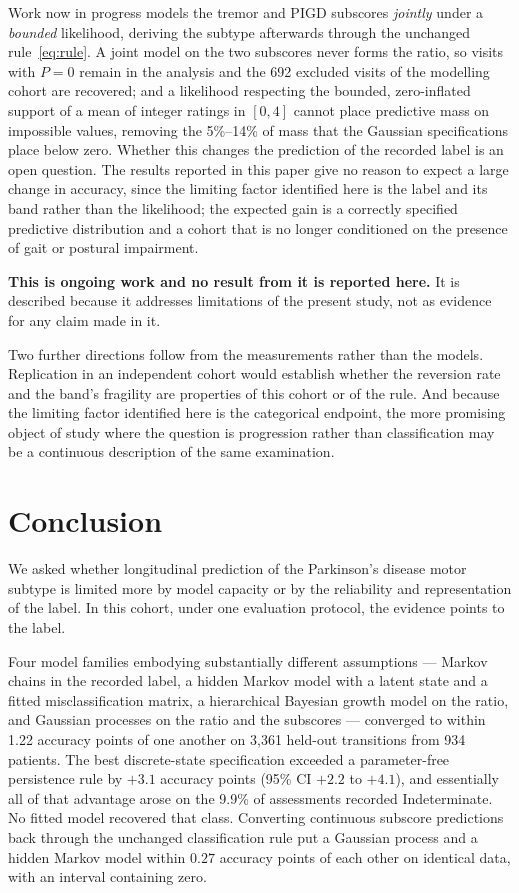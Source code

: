 \documentclass[11pt]{article}
\begin{document}
Work now in progress models the tremor and PIGD subscores \emph{jointly} under a
\emph{bounded} likelihood, deriving the subtype afterwards through the unchanged
rule~\eqref{eq:rule}. A joint model on the two subscores never forms the ratio,
so visits with $P = 0$ remain in the analysis and the 692 excluded visits of the
modelling cohort are recovered; and a likelihood respecting the bounded,
zero-inflated support of a mean of integer ratings in $[0,4]$ cannot place
predictive mass on impossible values, removing the 5\%--14\% of mass that the
Gaussian specifications place below zero. Whether this changes the prediction of
the recorded label is an open question. The results reported in this paper give
no reason to expect a large change in accuracy, since the limiting factor
identified here is the label and its band rather than the likelihood; the
expected gain is a correctly specified predictive distribution and a cohort that
is no longer conditioned on the presence of gait or postural impairment.

\textbf{This is ongoing work and no result from it is reported here.} It is
described because it addresses limitations of the present study, not as evidence
for any claim made in it.

Two further directions follow from the measurements rather than the models.
Replication in an independent cohort would establish whether the reversion rate
and the band's fragility are properties of this cohort or of the rule.
And because the limiting factor identified here is the categorical endpoint,
the more promising object of study where the question is progression rather than
classification may be a continuous description of the same examination.

\section{Conclusion}

We asked whether longitudinal prediction of the Parkinson's disease motor
subtype is limited more by model capacity or by the reliability and
representation of the label. In this cohort, under one evaluation protocol, the
evidence points to the label.

Four model families embodying substantially different assumptions --- Markov
chains in the recorded label, a hidden Markov model with a latent state and a
fitted misclassification matrix, a hierarchical Bayesian growth model on the
ratio, and Gaussian processes on the ratio and the subscores --- converged to
within 1.22 accuracy points of one another on 3,361 held-out transitions from
934 patients. The best discrete-state specification exceeded a parameter-free
persistence rule by $+3.1$ accuracy points (95\% CI $+2.2$ to $+4.1$), and
essentially all of that advantage arose on the 9.9\% of assessments recorded
Indeterminate. No fitted model recovered that class. Converting continuous
subscore predictions back through the unchanged classification rule put a
Gaussian process and a hidden Markov model within $0.27$ accuracy points of each
other on identical data, with an interval containing zero.
\end{document}
